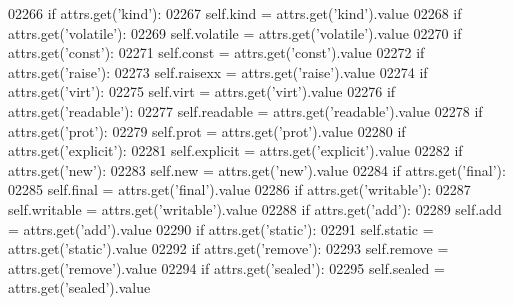 \begin{DoxyCode}
{{{{{{{{{{{{{{{{{{{{{{{{{{{{{{{{{{{{{{{{{{{{{{{{{{{{{{{{{{{{{{{{{{{{{{{{{{{{{{{{{{{{{{{{{{{{{{{{{{{{{{{{{{{{{{{{{{{{{{{{{{{{{{{{{{{{{{{{{{{{{{{{{{{{{{{{{{{{{{{{{{{{{{{{{{02266         \textcolor{keywordflow}{if} attrs.get(\textcolor{stringliteral}{'kind'}):
02267             self.kind = attrs.get(\textcolor{stringliteral}{'kind'}).value
02268         \textcolor{keywordflow}{if} attrs.get(\textcolor{stringliteral}{'volatile'}):
02269             self.volatile = attrs.get(\textcolor{stringliteral}{'volatile'}).value
02270         \textcolor{keywordflow}{if} attrs.get(\textcolor{stringliteral}{'const'}):
02271             self.const = attrs.get(\textcolor{stringliteral}{'const'}).value
02272         \textcolor{keywordflow}{if} attrs.get(\textcolor{stringliteral}{'raise'}):
02273             self.raisexx = attrs.get(\textcolor{stringliteral}{'raise'}).value
02274         \textcolor{keywordflow}{if} attrs.get(\textcolor{stringliteral}{'virt'}):
02275             self.virt = attrs.get(\textcolor{stringliteral}{'virt'}).value
02276         \textcolor{keywordflow}{if} attrs.get(\textcolor{stringliteral}{'readable'}):
02277             self.readable = attrs.get(\textcolor{stringliteral}{'readable'}).value
02278         \textcolor{keywordflow}{if} attrs.get(\textcolor{stringliteral}{'prot'}):
02279             self.prot = attrs.get(\textcolor{stringliteral}{'prot'}).value
02280         \textcolor{keywordflow}{if} attrs.get(\textcolor{stringliteral}{'explicit'}):
02281             self.explicit = attrs.get(\textcolor{stringliteral}{'explicit'}).value
02282         \textcolor{keywordflow}{if} attrs.get(\textcolor{stringliteral}{'new'}):
02283             self.new = attrs.get(\textcolor{stringliteral}{'new'}).value
02284         \textcolor{keywordflow}{if} attrs.get(\textcolor{stringliteral}{'final'}):
02285             self.final = attrs.get(\textcolor{stringliteral}{'final'}).value
02286         \textcolor{keywordflow}{if} attrs.get(\textcolor{stringliteral}{'writable'}):
02287             self.writable = attrs.get(\textcolor{stringliteral}{'writable'}).value
02288         \textcolor{keywordflow}{if} attrs.get(\textcolor{stringliteral}{'add'}):
02289             self.add = attrs.get(\textcolor{stringliteral}{'add'}).value
02290         \textcolor{keywordflow}{if} attrs.get(\textcolor{stringliteral}{'static'}):
02291             self.static = attrs.get(\textcolor{stringliteral}{'static'}).value
02292         \textcolor{keywordflow}{if} attrs.get(\textcolor{stringliteral}{'remove'}):
02293             self.remove = attrs.get(\textcolor{stringliteral}{'remove'}).value
02294         \textcolor{keywordflow}{if} attrs.get(\textcolor{stringliteral}{'sealed'}):
02295             self.sealed = attrs.get(\textcolor{stringliteral}{'sealed'}).value
}}}}}}}}}}}}}}}}}}}}}}}}}}}}}}}}}}}}}}}}}}}}}}}}}}}}}}}}}}}}}}}}}}}}}}}}}}}}}}}}}}}}}}}}}}}}}}}}}}}}}}}}}}}}}}}}}}}}}}}}}}}}}}}}}}}}}}}}}}}}}}}}}}}}}}}}}}}}}}}}}}}}}}}}}}
\end{DoxyCode}
